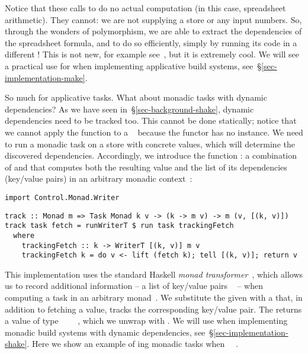\noindent
Notice that these calls to  do no actual computation (in this
case, spreadsheet arithmetic). They cannot: we are not supplying a store or any
input numbers. So, through the wonders of polymorphism, we are able to extract
the dependencies of the spreadsheet formula, and to do so efficiently, simply by
running its code in a different ! This is not new, for example
see~\citet{free-applicatives}, but it is extremely cool. We will see a practical
use for  when implementing applicative build systems,
see~\S\ref{sec-implementation-make}.

So much for applicative tasks. What about monadic tasks with dynamic
dependencies? As we have seen in~\S\ref{sec-background-shake}, dynamic
dependencies need to be tracked too. This cannot be done statically; notice that
we cannot apply the function  to a ~ because
the  functor has no  instance. We need to run a monadic task
on a store with concrete values, which will determine the discovered
dependencies. Accordingly, we introduce the function : a combination
of  and  that computes both the resulting value and
the list of its dependencies (key/value pairs) in an arbitrary monadic
context~:

\vspace{1mm}
\begin{verbatim}
import Control.Monad.Writer
\end{verbatim}
\vspace{0.5mm}
\begin{verbatim}
track :: Monad m => Task Monad k v -> (k -> m v) -> m (v, [(k, v)])
track task fetch = runWriterT $ run task trackingFetch
  where
    trackingFetch :: k -> WriterT [(k, v)] m v
    trackingFetch k = do v <- lift (fetch k); tell [(k, v)]; return v
\end{verbatim}
\vspace{1mm}

\noindent
This implementation uses the standard Haskell  \emph{monad
transformer}~\cite{liang1995monad}, which allows us to record additional
information -- a list of key/value pairs \hs{[(@@k,}~\hs{v)]} -- when computing
a task in an arbitrary monad~. We substitute the given  with a
 that, in addition to fetching a value, tracks the
corresponding key/value pair. The  returns a value of type
~\hs{[(@@k,}~\hs{v)]}~~, which we unwrap with
. We will use  when implementing monadic build systems
with dynamic dependencies, see~\S\ref{sec-implementation-shake}. Here we show an
example of ing monadic tasks when ~\hs{=}~.

